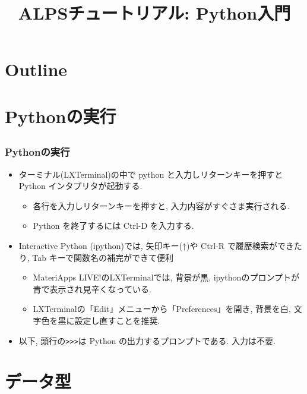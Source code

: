 
\title{ALPSチュートリアル: Python入門}



\begin{frame}
  \titlepage
\end{frame}

\section*{Outline}
\begin{frame}
  \tableofcontents
\end{frame}

\section{Pythonの実行}
\subsection*{\redm\whiteb\greenb}

\begin{frame}[t, fragile]
\frametitle{Pythonの実行}

\begin{itemize}
\item ターミナル(LXTerminal)の中で python と入力しリターンキーを押すと Python インタプリタが起動する.
  \begin{itemize}
  \item 各行を入力しリターンキーを押すと, 入力内容がすぐさま実行される.
  \item Python を終了するには Ctrl-D を入力する.
  \end{itemize}
\item Interactive Python (ipython)では, 矢印キー(↑)や Ctrl-R で履歴検索ができたり, Tab キーで関数名の補完ができて便利
  \begin{itemize}
  \item MateriApps LIVE!のLXTerminalでは, 背景が黒, ipythonのプロンプトが青で表示され見辛くなっている.
  \item LXTerminalの「Edit」メニューから「Preferences」を開き, 背景を白, 文字色を黒に設定し直すことを推奨.
  \end{itemize}
\item 以下, 頭行の\verb+>>>+は Python の出力するプロンプトである. 入力は不要.
\end{itemize}
\end{frame}

\section{データ型}
